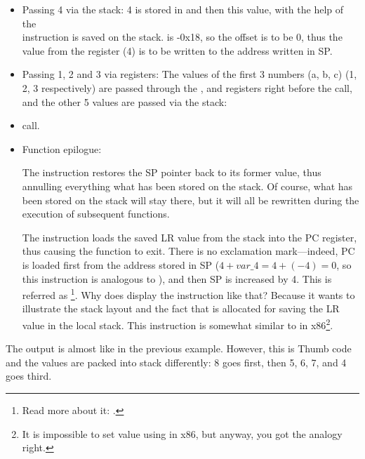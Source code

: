 \begin{itemize}
\item Passing 4 via the stack: 4 is stored in  and then this value, with the help of the \\
 instruction is saved on the stack.
 is -0x18, so the offset is to be 0, thus the value from the  register (4) is to be written to the address written in \ac{SP}.

\item Passing 1, 2 and 3 via registers:
The values of the first 3 numbers (a, b, c) (1, 2, 3 respectively) are passed through the 
,  and 
registers right before the \printf call, and the other
5 values are passed via the stack:

\item \printf call.

\item Function epilogue:

The  instruction restores the \ac{SP} pointer back to its former value,
thus annulling everything what has been stored on the stack.
Of course, what has been stored on the stack will stay there, but it will all be rewritten during the execution of subsequent functions.

The  instruction loads the saved \ac{LR} value from the stack into the \ac{PC} register, thus causing the function to exit.
There is no exclamation mark---indeed, \ac{PC} is loaded first from the address stored in \ac{SP} ($4+var\_4=4+(-4)=0$, so this instruction is analogous to ), and then \ac{SP} is increased by 4.
This is referred as \footnote{Read more about it: .}.
Why does \IDA display the instruction like that?
Because it wants to illustrate the stack layout and the fact that  is allocated for saving the \ac{LR} value in the local stack.
This instruction is somewhat similar to  in x86\footnote{It is impossible to set  value using \POP in x86, but anyway, you got the analogy right.}.

\end{itemize}

\myparagraph{\OptimizingKeilVI: \ThumbMode}



The output is almost like in the previous example. However, this is Thumb code and the values are packed into stack differently: 
8 goes first, then 5, 6, 7, and 4 goes third.

